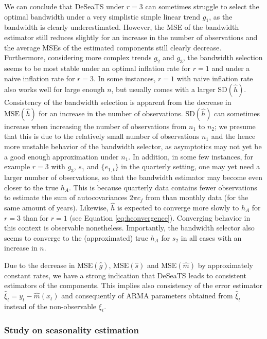 We can conclude that DeSeaTS under \(r=3\) can sometimes struggle to select the optimal bandwidth under a very simplistic simple linear trend \(g_1\), as the bandwidth is clearly underestimated. However, the MSE of the bandwidth estimator still reduces slightly for an increase in the number of observations and the average MSEs of the estimated components still clearly decrease. Furthermore, considering more complex trends \(g_2\) and \(g_3\), the bandwidth selection seems to be most stable under an optimal inflation rate for \(r=1\) and under a naive inflation rate for \(r=3\). In some instances, \(r=1\) with naive inflation rate also works well for large enough \(n\), but usually comes with a larger \(\text{SD}\left(\hat h\right)\). Consistency of the bandwidth selection is apparent from the decrease in \(\text{MSE}\left(\hat h\right)\) for an increase in the number of observations. \(\text{SD}\left(\hat h\right)\) can sometimes increase when increasing the number of observations from \(n_1\) to \(n_2\); we presume that this is due to the relatively small number of observations \(n_1\) and the hence more unstable behavior of the bandwidth selector, as asymptotics may not yet be a good enough approximation under \(n_1\). In addition, in some few instances, for example \(r=3\) with \(g_3\), \(s_1\) and \(\{e_{1,t}\}\) in the quarterly setting, one may yet need a larger number of observations, so that the bandwidth estimator may become even closer to the true \(h_A\). This is because quarterly data contains fewer observations to estimate the sum of autocovariances \(2\pi c_f\) from than monthly data (for the same amount of years). Likewise, \(\hat h\) is expected to converge more slowly to \(h_A\) for \(r=3\) than for \(r=1\) (see Equation \eqref{eq:hconvergence}). Converging behavior in this context is observable nonetheless. Importantly, the bandwidth selector also seems to converge to the (approximated) true \(h_A\) for \(s_2\) in all cases with an increase in \(n\).

Due to the decrease in \(\text{MSE}\left(\hat g\right)\), \(\text{MSE}\left(\hat s\right)\) and \(\text{MSE}\left(\hat m\right)\) by approximately constant rates, we have a strong indication that DeSeaTS leads to consistent estimators of the components. This implies also consistency of the error estimator \(\hat\xi_t=y_t-\hat m(x_t)\) and consequently of ARMA parameters obtained from \(\hat\xi_t\) instead of the non-observable \(\xi_t\).

\subsubsection{Study on seasonality estimation}\label{sec:seasadjuststudy}

